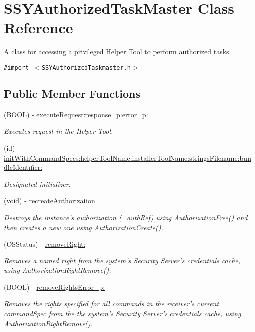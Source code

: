 \hypertarget{class_s_s_y_authorized_task_master}{
\section{SSYAuthorizedTaskMaster Class Reference}
\label{class_s_s_y_authorized_task_master}
}
A class for accessing a privileged Helper Tool to perform authorized tasks.  


{\tt \#import $<$SSYAuthorizedTaskmaster.h$>$}

\subsection*{Public Member Functions}
\begin{CompactItemize}
\item 
(BOOL) - \hyperlink{class_s_s_y_authorized_task_master_1dc3930fb2b15f7945f8d129c055d9fa}{executeRequest:response\_\-p:error\_\-p:}
\begin{CompactList}\small\item\em Executes request in the Helper Tool. \item\end{CompactList}\item 
(id) - \hyperlink{class_s_s_y_authorized_task_master_b5e2843812bcad27dd3d89818cc11cef}{initWithCommandSpecs:helperToolName:installerToolName:stringsFilename:bundleIdentifier:}
\begin{CompactList}\small\item\em Designated initializer. \item\end{CompactList}\item 
(void) - \hyperlink{class_s_s_y_authorized_task_master_9d441761cf1e564a0c96c7ddf6f58837}{recreateAuthorization}
\begin{CompactList}\small\item\em Destroys the instance's authorization (\_\-authRef) using AuthorizationFree() and then creates a new one using AuthorizationCreate(). \item\end{CompactList}\item 
(OSStatus) - \hyperlink{class_s_s_y_authorized_task_master_3d824456e1398ac9d64026f4b35b183b}{removeRight:}
\begin{CompactList}\small\item\em Removes a named right from the system's Security Server's credentials cache, using AuthorizationRightRemove(). \item\end{CompactList}\item 
(BOOL) - \hyperlink{class_s_s_y_authorized_task_master_91bec7ba1991e2f738babb707303a7e0}{removeRightsError\_\-p:}
\begin{CompactList}\small\item\em Removes the rights specified for all commands in the receiver's current commandSpec from the the system's Security Server's credentials cache, using AuthorizationRightRemove(). \item\end{CompactList}\end{CompactItemize}
